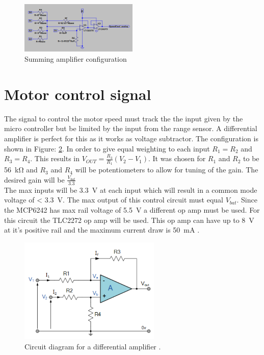 \begin{figure}[H]
\centering
\includegraphics[width=0.5\textwidth]{./Figures/DAC_sim_cir.png}
\caption{Summing amplifier configuration}
\label{fig:DAC_sim_sumAmp}
\end{figure}

\clearpage
\section{Motor control signal}
The signal to control the motor speed must track the the input given by the micro controller but be limited by the input from the range sensor. A differential amplifier is perfect for this as it works as voltage subtractor. The configuration is shown in Figure: \ref{fig:mtrl_ctrl_dif}. 
In order to give equal weighting to each input $R_1 = R_2$ and $R_3 = R_4$. This results in $V_{OUT} = \frac{R_3}{R_1} (V_2-V_1)$. It was chosen for $R_1$ and $R_2$ to be \SI{56}{\kilo\ohm} and $R_3$ and $R_4$ will be potentiometers to allow for tuning of the gain. The desired gain will be $\frac{V_{bat}}{3.3}$\\

The max inputs will be \SI{3.3}{\volt} at each input which will result in a common mode voltage of < \SI{3.3}{\volt}. The max output of this control circuit must equal $V_{bat}$. Since the MCP6242 has max rail voltage of \SI{5.5}{\volt} a different op amp must be used. For this circuit the TLC2272 op amp will be used. This op amp can have up to \SI{8}{\volt} at it's positive rail and the maximum current draw is \SI{50}{\milli\ampere} \cite{TLC2272}.

\begin{figure}[H]
\centering
\includegraphics[width = 0.6\textwidth]{./Figures/Mtr_Ctrl_Dif.png}
\caption{Circuit diagram for a differential amplifier \cite{DifAmp}.}
\label{fig:mtrl_ctrl_dif}
\end{figure}

